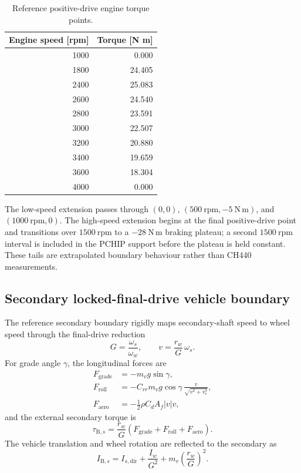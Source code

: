 \documentclass[11pt]{report}
\numberwithin{equation}{section}
\begin{document}
\begin{table}[H]
\centering
\small
\caption{Reference positive-drive engine torque points.}
\label{tab:results_engine_curve}
\begin{tabular}{@{}rr@{}}
\toprule
Engine speed [rpm] & Torque [N m] \\ \midrule
1000 & 0.000 \\
1800 & 24.405 \\
2400 & 25.083 \\
2600 & 24.540 \\
2800 & 23.591 \\
3000 & 22.507 \\
3200 & 20.880 \\
3400 & 19.659 \\
3600 & 18.304 \\
4000 & 0.000 \\
\bottomrule
\end{tabular}
\end{table}

The low-speed extension passes through
\((0,0)\), \((500~\mathrm{rpm},-5~\mathrm{N\,m})\), and
\((1000~\mathrm{rpm},0)\).  The high-speed extension begins at the final
positive-drive point and transitions over \(1500~\mathrm{rpm}\) to a
\(-28~\mathrm{N\,m}\) braking plateau; a second \(1500~\mathrm{rpm}\) interval is
included in the PCHIP support before the plateau is held constant.  These tails
are extrapolated boundary behaviour rather than CH440 measurements.

\subsection{Secondary locked-final-drive vehicle boundary}
\label{app:secondary_vehicle_boundary}

The reference secondary boundary rigidly maps secondary-shaft speed to wheel
speed through the final-drive reduction
\begin{equation}
G=\frac{\omega_s}{\omega_w},
\qquad
v=\frac{r_w}{G}\,\omega_s.
\label{eq:reference_final_drive_kinematics}
\end{equation}
For grade angle \(\gamma\), the longitudinal forces are
\begin{align}
F_{\mathrm{grade}} &=-m_v g\sin\gamma,\\
F_{\mathrm{roll}} &=-C_{rr}m_v g\cos\gamma\,
\frac{v}{\sqrt{v^2+v_\epsilon^2}},\\
F_{\mathrm{aero}} &=-\frac{1}{2}\rho C_d A_f\lvert v\rvert v,
\end{align}
and the external secondary torque is
\begin{equation}
\tau_{\mathrm{B},s}
=
\frac{r_w}{G}
\left(F_{\mathrm{grade}}+F_{\mathrm{roll}}+F_{\mathrm{aero}}\right).
\label{eq:reference_vehicle_torque}
\end{equation}
The vehicle translation and wheel rotation are reflected to the secondary as
\begin{equation}
I_{\mathrm{B},s}
=
I_{s,\mathrm{dir}}
+\frac{I_w}{G^2}
+m_v\left(\frac{r_w}{G}\right)^2.
\label{eq:reference_vehicle_inertia}
\end{equation}
\end{document}
